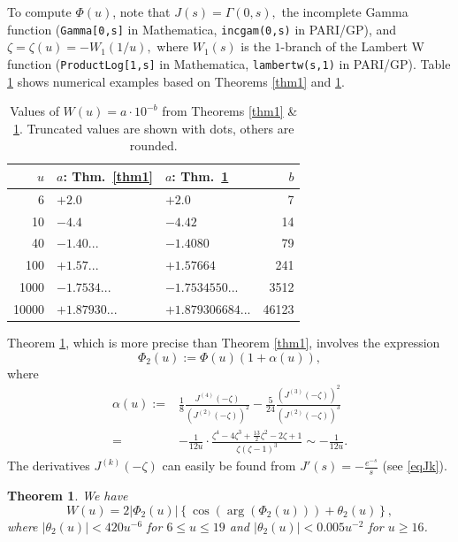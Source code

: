 \documentclass[11pt]{amsart}
\newtheorem{theorem}{Theorem}
\begin{document}
To compute $\Phi(u)$, note that
$
J(s)=\Gamma(0,s),
$
the incomplete Gamma function (\texttt{Gamma[0,s]} in Mathematica, \texttt{incgam(0,s)} in PARI/GP), 
and
$
\zeta = \zeta(u) =-W_{1}\left(1/u\right),
$
where $W_{1}(s)$ is the $1$-branch
of the Lambert W function (\texttt{ProductLog[1,s]} in Mathematica, \texttt{lambertw(s,1)} in PARI/GP).
Table \ref{table1} shows numerical examples based on Theorems \ref{thm1} and \ref{thm2}.
\begin{table}[h] 
  \centering 
  \begin{tabular}{|r|l|l|r|} 
    \hline
    $u$ & $a$: Thm.~\ref{thm1} & $a$: Thm.~\ref{thm2} & $b$ \\ 
    \hline \hline
    6 & $+2.0$ & $+2.0$ & 7 \\ 
    \hline
10 & $-4.4$ & $-4.42$ & 14 \\ 
   \hline
    40 & $-1.40...$ & $-1.4080$ & 79 \\
    \hline
   100 & $+1.57...$ & $+1.57664$ & 241 \\
\hline
 1000 & $-1.7534...$ & $-1.7534550...$ & 3512 \\
\hline
 10000 & $+1.87930...$ & $+1.879306684...$ & 46123 \\
\hline
  \end{tabular}
   \caption{Values of $W(u) = a \cdot 10^{-b}$ from Theorems \ref{thm1} \& \ref{thm2}. 
Truncated values are shown with dots, others are rounded.} 
   \label{table1} 
\end{table}

Theorem \ref{thm2}, which is more precise than Theorem \ref{thm1}, involves the expression
$$
\Phi_2(u):=\Phi(u)(1+\alpha(u)),
$$
where 
\begin{equation*}
\begin{split}
\alpha(u)  := & \frac{1}{8} \frac{J^{(4)}(-\zeta)}{(J^{(2)}(-\zeta))^2} - \frac{5}{24} \frac{(J^{(3)}(-\zeta))^2}{(J^{(2)}(-\zeta))^3} \\
  = & -\frac{1}{12u} \cdot \frac{ \zeta^4-4 \zeta^3+\frac{13}{2} \zeta^2-2 \zeta+1}{ \zeta (\zeta-1)^3 }
 \sim -\frac{1}{12u}.
\end{split}
\end{equation*}
The derivatives $J^{(k)}(-\zeta)$ can easily be found from $J'(s)=-\frac{e^{-s}}{s}$ (see \eqref{eqJk}).

\begin{theorem}\label{thm2}
We have 
$$
W(u)=2 |\Phi_2(u)|\left\{\cos(\arg(\Phi_2(u)))+\theta_2(u)\right\},
$$
where $|\theta_2(u)|< 420 u^{-6}$ for $6 \le u\le 19$ and $|\theta_2(u)|< 0.005 u^{-2}$ for $u\ge 16$.
\end{theorem}
\end{document}
